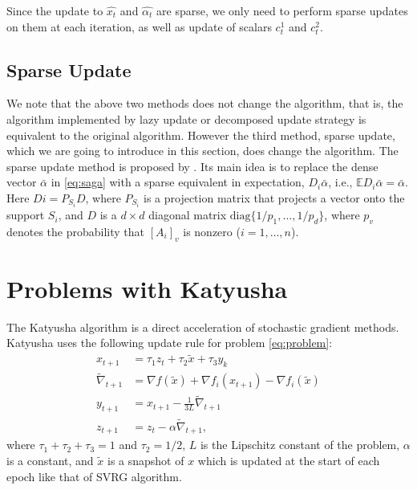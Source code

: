 \documentclass{article}
\begin{document}
\bigbreak

Since the update to $\hat{x_t}$ and
$\hat{\alpha_t}$ %
are sparse, we only need to perform sparse updates on them at each iteration, as well as update of scalars $c_t^1$ and $c_t^2$.


\subsection{Sparse Update}
We note that the above two methods does not change the algorithm, that is, the algorithm implemented by lazy update or decomposed update strategy is equivalent to the original algorithm. However the third method, sparse update, which we are going to introduce in this section, does change the algorithm. The sparse update method is proposed by \cite{mania2015}. Its main idea is to replace the dense vector $\bar{\alpha}$ in \eqref{eq:saga} with a sparse equivalent in expectation, $D_i \bar{\alpha}$, i.e., $\mathbb{E} D_i \bar{\alpha} = \bar{\alpha}$. Here $Di = P_{S_i} D$, where $P_{S_i}$ is a projection matrix that projects a vector onto the support $S_i$, and $D$ is a  $d \times d$ diagonal matrix $\mathrm{diag}\{1/p_1, \dots, 1/p_d\}$, where $p_v$ denotes the probability that $[A_i]_v$ is nonzero ($i=1, \dots, n$).

\section{Problems with Katyusha}
The Katyusha algorithm \cite{allen2016} is a direct acceleration of stochastic gradient methods. Katyusha uses the following update rule for problem \eqref{eq:problem}:
\begin{equation} \label{eq:katyusha}
\begin{aligned}
    x_{t+1} &= \tau_1 z_t + \tau_2 \tilde{x} + \tau_3 y_k \\
    \tilde{\nabla}_{t+1} &= \nabla f(\tilde{x}) + \nabla f_i(x_{t+1}) - \nabla f_i(\tilde{x}) \\
    y_{t+1} &= x_{t+1} - \frac{1}{3L} \tilde{\nabla}_{t+1} \\
    z_{t+1} &= z_{t} - \alpha \tilde{\nabla}_{t+1},
\end{aligned}
\end{equation}
where $\tau_1 + \tau_2 + \tau_3 = 1$ and $\tau_2 = 1/2$, $L$ is the Lipschitz constant of the problem, $\alpha$ is a constant, and $\tilde{x}$ is a snapshot of $x$ which is updated at the start of each epoch like that of SVRG algorithm.
\end{document}
